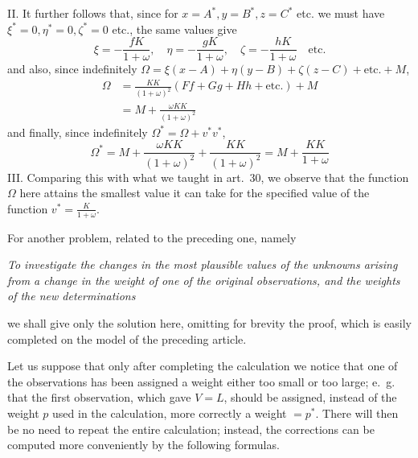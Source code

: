 II. It further follows that, since for \(x=A^*,\allowbreak y=B^*,\allowbreak z=C^*\) etc. we must have \(\xi^*=0,\allowbreak\eta^*=0,\allowbreak\zeta^*=0\) etc., the same values give
\[
\xi=-\frac{fK}{1+\omega},\quad\eta=-\frac{gK}{1+\omega},\quad\zeta=-\frac{hK}{1+\omega}\quad\text{etc.}
\]
and also, since indefinitely
\(\Omega=\xi(x-A)+\eta(y-B)+\zeta(z-C)+\text{etc.}+M\),
\[
\begin{aligned}
\Omega&=\frac{KK}{(1+\omega)^2}(Ff+Gg+Hh+\text{etc.})+M\\
&=M+\frac{\omega KK}{(1+\omega)^2}
\end{aligned}
\]
and finally, since indefinitely
\(\Omega^*=\Omega+v^*v^*\),
\[
\Omega^*=M+\frac{\omega KK}{(1+\omega)^2}+\frac{KK}{(1+\omega)^2}=M+\frac{KK}{1+\omega}
\]
III. Comparing this with what we taught in art.\ 30, we observe that the function \(\Omega\) here attains the smallest value it can take for the specified value of the function \(v^*=\frac{K}{1+\omega}\).

For another problem, related to the preceding one, namely

\textit{To investigate the changes in the most plausible values of the unknowns arising from a change in the weight of one of the original observations, and the weights of the new determinations}

\noindent we shall give only the solution here, omitting for brevity the proof, which is easily completed on the model of the preceding article.

Let us suppose that only after completing the calculation we notice that one of the observations has been assigned a weight either too small or too large; e.\ g. that the first observation, which gave \(V=L\), should be assigned, instead of the weight \(p\) used in the calculation, more correctly a weight \(=p^*\). There will then be no need to repeat the entire calculation; instead, the corrections can be computed more conveniently by the following formulas.

